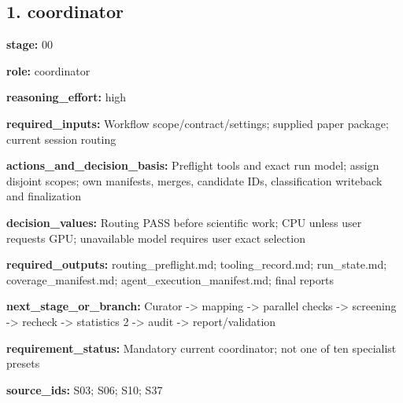 \documentclass[10pt,a4paper]{article}
\begin{document}
\subsection*{1.\allowbreak{} coordinator}
\textbf{stage:} 00\par
\textbf{role:} coordinator\par
\textbf{reasoning\_\allowbreak{}effort:} high\par
\textbf{required\_\allowbreak{}inputs:} Workflow scope/\allowbreak{}contract/\allowbreak{}settings; supplied paper package; current session routing\par
\textbf{actions\_\allowbreak{}and\_\allowbreak{}decision\_\allowbreak{}basis:} Preflight tools and exact run model; assign disjoint scopes; own manifests, merges, candidate IDs, classification writeback and finalization\par
\textbf{decision\_\allowbreak{}values:} Routing PASS before scientific work; CPU unless user requests GPU; unavailable model requires user exact selection\par
\textbf{required\_\allowbreak{}outputs:} routing\_\allowbreak{}preflight.\allowbreak{}md; tooling\_\allowbreak{}record.\allowbreak{}md; run\_\allowbreak{}state.\allowbreak{}md; coverage\_\allowbreak{}manifest.\allowbreak{}md; agent\_\allowbreak{}execution\_\allowbreak{}manifest.\allowbreak{}md; final reports\par
\textbf{next\_\allowbreak{}stage\_\allowbreak{}or\_\allowbreak{}branch:} Curator -\allowbreak{}> mapping -\allowbreak{}> parallel checks -\allowbreak{}> screening -\allowbreak{}> recheck -\allowbreak{}> statistics 2 -\allowbreak{}> audit -\allowbreak{}> report/\allowbreak{}validation\par
\textbf{requirement\_\allowbreak{}status:} Mandatory current coordinator; not one of ten specialist presets\par
\textbf{source\_\allowbreak{}ids:} S03; S06; S10; S37\par
\end{document}
